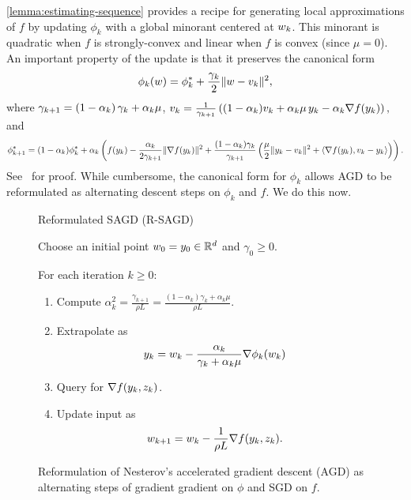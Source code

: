 \autoref{lemma:estimating-sequence} provides a recipe for generating local approximations of \( f \) by updating \( \phi_k \) with a global minorant centered at \( w_k \). 
This minorant is quadratic when \( f \) is strongly-convex and linear when \( f \) is convex (since \( \mu = 0 \)).
An important property of the update is that it preserves the canonical form
\begin{align*}
    \phi_k(w) = \phi_k^* + \frac{\gamma_k}{2}\|w - v_k\|^2,
\end{align*}
where \( \gamma_{k+1} = \left(1 - \alpha_{k}\right)\gamma_k + \alpha_{k} \mu \), \( v_k = \frac{1}{\gamma_{k+1}} \left((1-\alpha_{k})v_k + \alpha_{k} \mu \, y_k - \alpha_{k} \nabla f(y_k)\right), \) and 
\[ \phi^*_{k+1} = (1 - \alpha_{k}) \phi^*_k + \alpha_{k}\left(f(y_k) - \frac{\alpha_{k}}{2 \gamma_{k+1}} \|\nabla f(y_k)\|^2 + \frac{(1 - \alpha_{k})\gamma_k}{\gamma_{k+1}}\left(\frac{\mu}{2}\|y_k - v_k\|^2 + \left\langle\nabla f(y_k), v_k - y_k\right\rangle\right)\right). \]
See~\citet[Lemma 2.2.3]{nesterov2004lectures} for proof.
While cumbersome, the canonical form for \( \phi_k \) allows AGD to be reformulated as alternating descent steps on \( \phi_k \) and \( f \).
We do this now.

\begin{figure}[t]
    \centering
    \begin{procedure}{Reformulated SAGD (R-SAGD)}
        \item Choose an initial point \( w_0 = y_0 \in \mathbb{R}^d \) and \( \gamma_0 \geq 0 \).
        \item For each iteration \( k \geq 0 \):
            \begin{enumerate}
                \item Compute 
                    \( \alpha^2_k = \frac{\gamma_{k+1}}{\rho L } = \frac{(1-\alpha_k)\gamma_k + \alpha_k \mu}{\rho L} \).
                \item Extrapolate as
                    \[ y_k = w_k - \frac{\alpha_k}{\gamma_k + \alpha_k \mu} \nabla \phi_k(w_k) \]

                \item Query \oracle{} for \( \nabla f(y_k, z_{k}) \). 
                \item Update input as\vspace{-1ex}%
                    \[ w_{k+1} = w_k - \frac{1}{\rho L} \nabla f(y_k, z_{k}). \]
            \end{enumerate}
    \end{procedure}
    \caption{Reformulation of Nesterov's accelerated gradient descent (AGD) as alternating steps of gradient gradient on \( \phi \) and SGD on \( f \).}%
    \label{procedure:reformulated-agd}
\end{figure}

